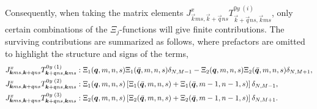 Consequently, when taking the matrix elements $J^x_{\vec{k} ms, \vec{k}+\vec{q}ns} T^{0y \; (i)}_{\vec{k}+\vec{q}ns, \vec{k}ms}$, only certain combinations of the $\Xi_j$-functions will give finite contributions.
The surviving contributions are summarized as follows, where prefactors are omitted to highlight the structure and signs of the  terms,
\begin{align*}
  J^x_{\bm{k} ms, \bm{k}+\mathfrak{q}ns} T^{0y \; (1)}_{\bm{k}+\mathfrak{q}ns, \bm{k}ms}
  &: \Xi_{1} (\bm{q}, m,n,s) \Xi_1 (\bar{\bm{q}}, m, n, s) \delta _{N, M-1} - \Xi_{2} (\bm{q}, m,n,s) \Xi_2 (\bar{\bm{q}}, m, n, s) \delta _{N, M+1},\\
  J^x_{\bm{k} ms, \bm{k}+\mathfrak{q}ns} T^{0y \; (2)}_{\bm{k} + \mathfrak{q}ns, \bm{k}ms}
  &:  \Xi_{1} (\bm{q}, m,n,s) \left[
    \Xi_{1} (\bar{\bm{q}}, m, n, s) + \Xi _1 (\bar{\bm{q}}, m-1, n-1, s)
  \right] \delta _{N, M-1},\\
  J^x_{\bm{k} ms, \bm{k}+\mathfrak{q}ns} T^{0y \; (3)}_{\bm{k}+\mathfrak{q}ns, \bm{k}ms}
  &: \Xi_{2} (\bm{q}, m,n,s) \left[
    \Xi_{2} (\bar{\bm{q}}, m, n, s) + \Xi _2 (\bar{\bm{q}}, m-1, n-1, s)
  \right] \delta _{N, M+1}.\\
\end{align*}

